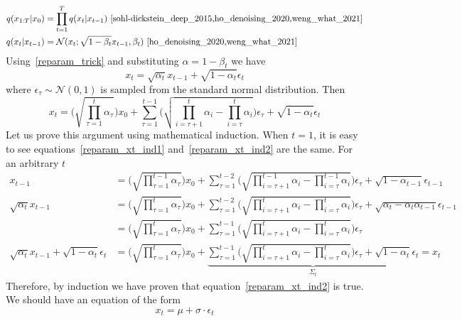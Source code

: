 \documentclass{article}
\numberwithin{equation}{subsection}
\begin{document}
\begin{align}
    q(x_{1:T}|x_0) &= \prod_{t=1}^T q(x_t|x_{t-1})~\cite{sohl-dickstein_deep_2015,ho_denoising_2020,weng_what_2021}\\
    q(x_t|x_{t-1}) &= \mathcal{N}(x_t; \sqrt{1-\beta_t}x_{t-1}, \beta_t)~\cite{ho_denoising_2020,weng_what_2021}
\end{align}
Using~\ref{reparam_trick} and substituting $\alpha = 1-\beta_t$ we have
\begin{equation}
    x_t = \sqrt{\alpha_t}x_{t-1}+\sqrt{1-\alpha_t}\epsilon_t\label{reparam_xt_ind1}
\end{equation}
where $\epsilon_\tau \sim \mathcal{N}(0, 1)$ is sampled from the standard normal distribution. Then
\begin{equation}
    x_t = \Big(\sqrt{\prod_{\tau=1}^{t}\alpha_\tau}\Big)x_0+\sum_{\tau=1}^{t-1}\Big(\sqrt{\prod_{i=\tau+1}^{t}\alpha_i-\prod_{i=\tau}^{t}\alpha_i}\Big)\epsilon_\tau+\sqrt{1-\alpha_t}\epsilon_t\label{reparam_xt_ind2}
\end{equation}
Let us prove this argument using mathematical induction. When $t=1$, it is easy to see equations~\ref{reparam_xt_ind1} and~\ref{reparam_xt_ind2} are the same. For an arbitrary $t$
\begin{align}
    x_{t-1} &= \Big(\sqrt{\prod_{\tau=1}^{t-1}\alpha_\tau}\Big)x_0+\sum_{\tau=1}^{t-2}\Big(\sqrt{\prod_{i=\tau+1}^{t-1}\alpha_i-\prod_{i=\tau}^{t-1}\alpha_i}\Big)\epsilon_\tau+\sqrt{1-\alpha_{t-1}}\epsilon_{t-1}\\
    \sqrt{\alpha_t}x_{t-1} &= \Big(\sqrt{\prod_{\tau=1}^{t}\alpha_\tau}\Big)x_0+\sum_{\tau=1}^{t-2}\Big(\sqrt{\prod_{i=\tau+1}^{t}\alpha_i-\prod_{i=\tau}^{t}\alpha_i}\Big)\epsilon_\tau+\sqrt{\alpha_t-\alpha_t\alpha_{t-1}}\epsilon_{t-1}\\
     &= \Big(\sqrt{\prod_{\tau=1}^{t}\alpha_\tau}\Big)x_0+\sum_{\tau=1}^{t-1}\Big(\sqrt{\prod_{i=\tau+1}^{t}\alpha_i-\prod_{i=\tau}^{t}\alpha_i}\Big)\epsilon_\tau\\
     \sqrt{\alpha_t}x_{t-1}+\sqrt{1-\alpha_t}\epsilon_t&= \Big(\sqrt{\prod_{\tau=1}^{t}\alpha_\tau}\Big)x_0+\underbrace{\sum_{\tau=1}^{t-1}\Big(\sqrt{\prod_{i=\tau+1}^{t}\alpha_i-\prod_{i=\tau}^{t}\alpha_i}\Big)\epsilon_\tau+\sqrt{1-\alpha_t}\epsilon_t}_{\Sigma_t} = x_t
\end{align}
Therefore, by induction we have proven that equation~\ref{reparam_xt_ind2} is true. 
We should have an equation of the form 
\begin{equation}
    x_t = \mu + \sigma \cdot \epsilon_t
\end{equation}
\end{document}
